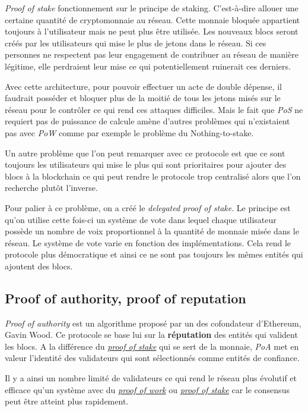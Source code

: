 \textit{Proof of stake} fonctionnement sur le principe de staking. C'est-à-dire allouer une certaine quantité de cryptomonnaie au réseau. Cette monnaie bloquée appartient toujours à l'utilisateur mais ne peut plus être utilisée. Les nouveaux blocs seront créés par les utilisateurs qui mise le plus de jetons dans le réseau. Si ces personnes ne respectent pas leur engagement de contribuer au réseau de manière légitime, elle perdraient leur mise ce qui potentiellement ruinerait ces derniers. 

Avec cette architecture, pour pouvoir effectuer un acte de double dépense, il faudrait posséder et bloquer plus de la moitié de tous les jetons misés sur le réseau pour le contrôler ce qui rend ces attaques difficiles. Mais le fait que \textit{PoS} ne requiert pas de puissance de calcule amène d'autres problèmes qui n'existaient pas avec \textit{PoW} comme par exemple le problème du Nothing-to-stake.

Un autre problème que l'on peut remarquer avec ce protocole est que ce sont toujours les utilisateurs qui mise le plus qui sont prioritaires pour ajouter des blocs à la blockchain ce qui peut rendre le protocole trop centralisé alors que l'on recherche plutôt l'inverse.

Pour palier à ce problème, on a créé le \textit{delegated proof of stake}. Le principe est qu'on utilise cette fois-ci un système de vote dans lequel chaque utilisateur possède un nombre de voix proportionnel à la quantité de monnaie misée dans le réseau. Le système de vote varie en fonction des implémentations. Cela rend le protocole plus démocratique et ainsi ce ne sont pas toujours les mêmes entités qui ajoutent des blocs.

\subsection{Proof of authority, proof of reputation}
\label{consensus:poa}

\textit{Proof of authority} est un algorithme proposé par un des cofondateur d'Ethereum, Gavin Wood. Ce protocole se base lui sur la \textbf{réputation} des entités qui valident les blocs. A la différence du \hyperref[consensus:pos]{\textit{proof of stake}} qui se sert de la monnaie, \textit{PoA} met en valeur l'identité des validateurs qui sont sélectionnés comme entités de confiance.

Il y a ainsi un nombre limité de validateurs ce qui rend le réseau plus évolutif et efficace qu'un système avec du \hyperref[consensus:pow]{\textit{proof of work}} ou \hyperref[consensus:pos]{\textit{proof of stake}} car le consensus peut être atteint plus rapidement.

